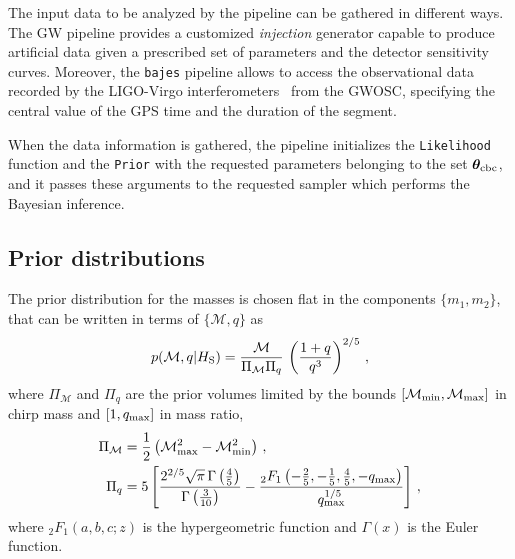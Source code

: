 \documentclass[prd,aps,twocolumn,a4paper,showkeys,nofootinbib,floatfix]{revtex4-1}
\newcommand{\be}{\begin{equation}}
\newcommand{\ee}{\end{equation}}
\def\M{\mathcal{M}}
\def\params{\boldsymbol{\theta}}
\newcommand{\bajes}{{\tt bajes}}
\begin{document}
The input data to be analyzed by the pipeline 
can be gathered in different ways.
The GW pipeline provides a customized {\it injection} generator
capable to produce artificial data given a prescribed set of 
parameters and the detector sensitivity curves.
Moreover, the {\bajes} pipeline allows to access 
the observational data recorded by the LIGO-Virgo 
interferometers~\cite{Aasi:2013wya,TheLIGOScientific:2014jea,TheVirgo:2014hva} from the GWOSC,
specifying the central value of the GPS time and the duration of the segment.

When the data information is gathered, 
the pipeline initializes the {\tt Likelihood} function 
and the {\tt Prior} with the requested parameters belonging to the set $\params_{\rm cbc}$,
and it passes these arguments to the requested sampler which performs the Bayesian inference.

\subsection{Prior distributions} 
\label{sec:prior}

The prior distribution for the masses is chosen flat in the components $\{m_1,m_2\}$,
that can be written in terms of $\{\M,q\}$ as 
\be
\label{eq:prior-mass}
p(\M,q|H_{\rm S}) = \frac{\M}{\Pi_{\M}\Pi_q} \, \left( \frac{1+q}{q^{3}} \right)^{2/5}\,,
\ee
where $\Pi_{\M}$ and $\Pi_q$ are the prior volumes 
limited by the bounds $[\M_{\rm min}, \M_{\rm max}]$ in chirp mass
and $[1,q_{\rm max}]$ in mass ratio,
\be
\label{eq:prior-mass-norm}
\begin{split}
\Pi_{\M} &= \frac{1}{2}\left(\M^2_{\rm max} - \M_{\rm min}^2\right)\,, \\
\Pi_{q} &=
5\left[\frac{2^{2/5}\sqrt{\pi}\,\Gamma\left(\frac{4}{5}\right)}{\Gamma\left(\frac{3}{10}\right)}
-\frac{{}_{2}F_1\left(-\frac{2}{5},-\frac{1}{5},\frac{4}{5},-q_{\rm max}\right)}{q_{\rm max}^{1/5}}\right]\,,\\
\end{split}
\ee
where ${}_{2}F_1(a,b,c;z)$
is the hypergeometric function 
and $\Gamma(x)$ is the Euler function. 
 
\end{document}

